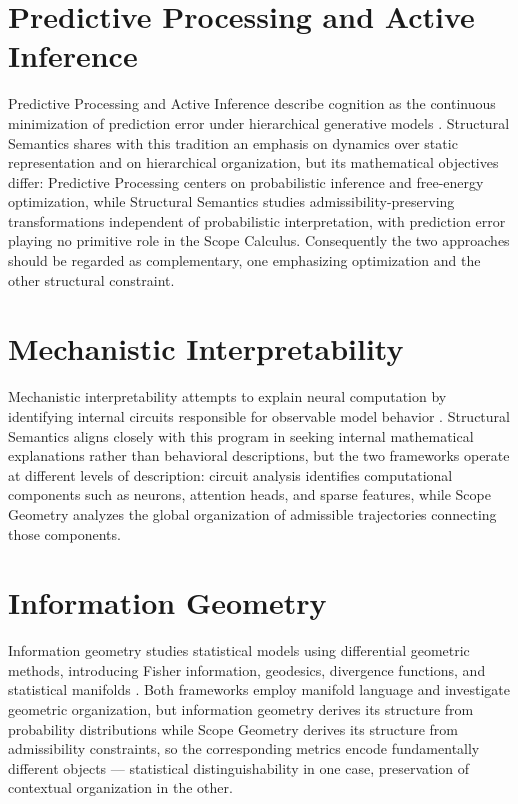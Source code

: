 \documentclass[11pt,twoside,openright]{book}
\numberwithin{equation}{chapter}
\theoremstyle{definition}
\theoremstyle{plain}
\theoremstyle{remark}
\theoremstyle{definition}
\begin{document}
\section{Predictive Processing and Active Inference}

Predictive Processing and Active Inference describe cognition as the
continuous minimization of prediction error under hierarchical generative
models \cite{Friston2010,Clark2013}. Structural Semantics shares with
this tradition an emphasis on dynamics over static representation and on
hierarchical organization, but its mathematical objectives differ:
Predictive Processing centers on probabilistic inference and free-energy
optimization, while Structural Semantics studies admissibility-preserving
transformations independent of probabilistic interpretation, with
prediction error playing no primitive role in the Scope Calculus.
Consequently the two approaches should be regarded as complementary, one
emphasizing optimization and the other structural constraint.

\section{Mechanistic Interpretability}

Mechanistic interpretability attempts to explain neural computation by
identifying internal circuits responsible for observable model behavior
\cite{Elhage2021,Olah2020,Nanda2023}. Structural Semantics aligns closely
with this program in seeking internal mathematical explanations rather
than behavioral descriptions, but the two frameworks operate at different
levels of description: circuit analysis identifies computational
components such as neurons, attention heads, and sparse features, while
Scope Geometry analyzes the global organization of admissible
trajectories connecting those components.

\section{Information Geometry}

Information geometry studies statistical models using differential
geometric methods, introducing Fisher information, geodesics, divergence
functions, and statistical manifolds \cite{Amari2016}. Both frameworks
employ manifold language and investigate geometric organization, but
information geometry derives its structure from probability
distributions while Scope Geometry derives its structure from
admissibility constraints, so the corresponding metrics encode
fundamentally different objects --- statistical distinguishability in one
case, preservation of contextual organization in the other.
\end{document}
